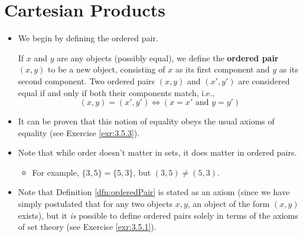 \documentclass[../main.tex]{subfiles}
\begin{document}
\section{Cartesian Products}\label{sse:3.5}
\begin{itemize}
    \item We begin by defining the ordered pair.
    \begin{dfn}\label{dfn:orderedPair}
        If $x$ and $y$ are any objects (possibly equal), we define the \textbf{ordered pair} $(x,y)$ to be a new object, consisting of $x$ as its first component and $y$ as its second component. Two ordered pairs $(x,y)$ and $(x',y')$ are considered equal if and only if both their components match, i.e.,
        \begin{equation*}
            (x,y)=(x',y') \Longleftrightarrow (x=x'\text{ and }y=y')
        \end{equation*}
    \end{dfn}
    \item It can be proven that this notion of equality obeys the usual axioms of equality (see Exercise \ref{exr:3.5.3}).
    \item {}Note that while order doesn't matter in sets, it does matter in ordered pairs.
    \begin{itemize}
        \item For example, $\{3,5\}=\{5,3\}$, but $(3,5)\neq(5,3)$.
    \end{itemize}
    \item Note that Definition \ref{dfn:orderedPair} is stated as an axiom (since we have simply postulated that for any two objects $x,y$, an object of the form $(x,y)$ exists), but it \emph{is} possible to define ordered pairs solely in terms of the axioms of set theory (see Exercise \ref{exr:3.5.1}).
\end{itemize}
\end{document}
